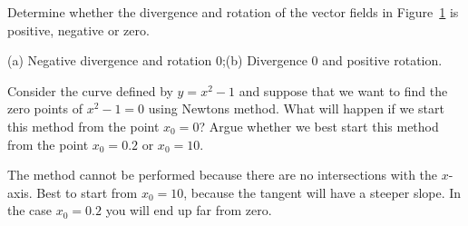 \begin{Exercise} Determine whether the divergence and rotation of the vector fields in Figure~\ref{fig_test1_2} is positive, negative or zero.
\begin{figure}[H]
\centering
\centerline{
}
\caption{\label{fig_test1_2}}

\end{figure}
\end{Exercise}

\begin{Answer}
(a) Negative divergence and rotation 0;\quad (b) Divergence 0 and positive rotation.    
\end{Answer}


\begin{Exercise} Consider the curve defined by $y=x^2-1$ and suppose that we want to find the zero points of $x^2-1=0$ using Newtons method.
\Question What will happen if we start this method from the point $x_0=0$? 
\Question Argue whether we best start this method from the point $x_0=0.2$ or $x_0=10$. 
\end{Exercise}

\begin{Answer}

\Question The method cannot be performed because there are no intersections with the $x$-axis.
\Question Best to start from $x_0=10$, because the tangent will have a steeper slope. In the case $x_0=0.2$ you will end up far from zero.
    
\end{Answer}



